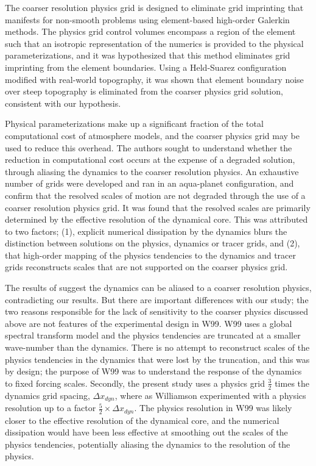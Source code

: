 \documentclass{agujournal}
\begin{document}
The coarser resolution physics grid is designed to eliminate grid imprinting that manifests for non-smooth problems using element-based high-order Galerkin methods. The physics grid control volumes encompass a region of the element such that an isotropic representation of the numerics is provided to the physical parameterizations, and it was hypothesized that this method eliminates grid imprinting from the element boundaries. Using a Held-Suarez configuration modified with real-world topography, it was shown that element boundary noise over steep topography is eliminated from the coarser physics grid solution, consistent with our hypothesis.

Physical parameterizations make up a significant fraction of the total computational cost of atmosphere models, and the coarser physics grid may be used to reduce this overhead. The authors sought to understand whether the reduction in computational cost occurs at the expense of a degraded solution, through aliasing the dynamics to the coarser resolution physics. An exhaustive number of grids were developed and ran in an aqua-planet configuration, and confirm that the resolved scales of motion are not degraded through the use of a coarser resolution physics grid. It was found that the resolved scales are primarily determined by the effective resolution of the dynamical core. This was attributed to two factors; (1), explicit numerical dissipation by the dynamics blurs the distinction between solutions on the physics, dynamics or tracer grids, and (2), that high-order mapping of the physics tendencies to the dynamics and tracer grids reconstructs scales that are not supported on the coarser physics grid.

The results of \cite[][hereafter referred to as W99]{W1999T} suggest the dynamics can be aliased to a coarser resolution physics, contradicting our results. But there are important differences with our study; the two reasons responsible for the lack of sensitivity to the coarser physics discussed above are not features of the experimental design in W99. W99 uses a global spectral transform model and the physics tendencies are truncated at a smaller wave-number than the dynamics. There is no attempt to reconstruct scales of the physics tendencies in the dynamics that were lost by the truncation, and this was by design; the purpose of W99 was to understand the response of the dynamics to fixed forcing scales. Secondly, the present study uses a physics grid $\frac{3}{2}$ times the dynamics grid spacing, $\Delta x_{dyn}$, where as Williamson experimented with a physics resolution up to a factor $\frac{5}{2} \times \Delta x_{dyn}$. The physics resolution in W99 was likely closer to the effective resolution of the dynamical core, and the numerical dissipation would have been less effective at smoothing out the scales of the physics tendencies, potentially aliasing the dynamics to the resolution of the physics.
\end{document}

